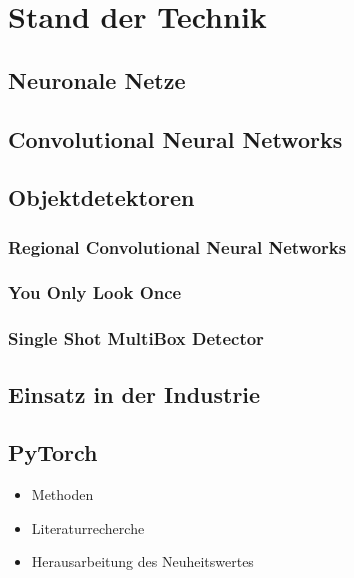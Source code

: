 \chapter{Stand der Technik}

\section{Neuronale Netze}


\section{Convolutional Neural Networks}


\section{Objektdetektoren}

\subsection{Regional Convolutional Neural Networks}

\subsection{You Only Look Once}

\subsection{Single Shot MultiBox Detector}

\section{Einsatz in der Industrie}

\section{PyTorch}

\begin{itemize}
	\item Methoden
	\item Literaturrecherche
	\item Herausarbeitung des Neuheitswertes 
\end{itemize}
